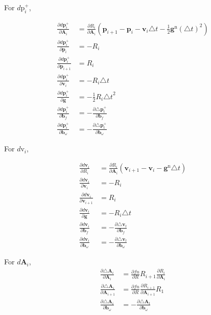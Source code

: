 \documentclass[12pt]{article}   %
\begin{document}
\begin{appendices}
For $d\text{p}^+_{i}$,

\begin{align}
\frac{\partial d\textbf{p}^+_{i}}{\partial \textbf{A}_{i}} &= \frac{\partial R_i}{\partial \textbf{A}_i} ( \textbf{p}_{i+1} - \textbf{p}_i - \textbf{v}_i \triangle t - \frac{1}{2} \textbf{g}^{\mathrm{n}} {(\triangle t)}^2 ) \\
\frac{\partial d\textbf{p}^+_{i}}{\partial \textbf{p}_{i}} &= -R_i \\
\frac{\partial d\textbf{p}^+_{i}}{\partial \textbf{p}_{i+1}} &= R_i \\
\frac{\partial d\textbf{p}^+_{i}}{\partial \textbf{v}_{i}} &= -R_i \triangle t \\
\frac{\partial d\textbf{p}^+_{i}}{\partial \textbf{g}} &= -\frac{1}{2} R_i {\triangle t}^2 \\
\frac{\partial d\textbf{p}^+_{i}}{\partial \textbf{b}_f} &= - \frac{\partial \triangle \textbf{p}^+_t}{\partial \textbf{b}_f}\\
\frac{\partial d\textbf{p}^+_{i}}{\partial \textbf{b}_\omega} &= - \frac{\partial \triangle \textbf{p}^+_t}{\partial \textbf{b}_\omega}
\end{align}

For $d\text{v}_{i}$,

\begin{align}
\frac{\partial d\textbf{v}_{i}}{\partial R_{i}} &= \frac{\partial R_i}{\partial \textbf{A}_i} (\textbf{v}_{i+1} - \textbf{v}_i - \textbf{g}^{\mathrm{n}} \triangle t) \\
\frac{\partial d\textbf{v}_{i}}{\partial \textbf{v}_{i}} &= -R_i \\
\frac{\partial d\textbf{v}_{i}}{\partial \textbf{v}_{i+1}} &= R_i \\
\frac{\partial d\textbf{v}_{i}}{\partial \textbf{g}} &= -R_i \triangle t \\
\frac{\partial d\textbf{v}_{i}}{\partial \textbf{b}_f} &= - \frac{\partial \triangle \textbf{v}_t}{\partial \textbf{b}_f}\\
\frac{\partial d\textbf{v}_{i}}{\partial \textbf{b}_\omega} &= - \frac{\partial \triangle \textbf{v}_t}{\partial \textbf{b}_\omega}
\end{align}

For $d\textbf{A}_{i}$,
\begin{align}
\frac{\partial \triangle \textbf{A}_{i}}{\partial \textbf{A}_{i}} &= \frac{\partial fn}{\partial R} R_{i+1} \frac{\partial R_i}{\partial \textbf{A}_{i}}\\
\frac{\partial \triangle \textbf{A}_{i}}{\partial \textbf{A}_{i+1}} &= \frac{\partial fn}{\partial R} \frac{\partial R_{i+1}}{\partial \textbf{A}_{i+1}} R_{1} \\
\frac{\partial \triangle \textbf{A}_{i}}{\partial \textbf{b}_\omega} &= - \frac{\partial \triangle \textbf{A}_t}{\partial \textbf{b}_\omega}
\end{align}


\end{appendices}
\end{document}

